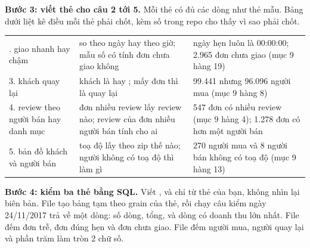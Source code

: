\textbf{Bước 3: viết thẻ cho câu 2 tới 5.} Mỗi thẻ có đủ các dòng như thẻ mẫu. Bảng dưới liệt kê điều mỗi thẻ phải chốt, kèm số trong repo cho thấy vì sao phải chốt.

\begin{xltabular}{\textwidth}{@{}P{2.8cm} L P{4.8cm}@{}}
\toprule
{} &  &  \\
\midrule
\endhead
\bottomrule
{}. giao nhanh hay chậm & so theo ngày hay theo giờ; mẫu số có tính đơn chưa giao không & ngày hẹn luôn là 00:00:00; 2.965 đơn chưa giao (mục 9 hàng 19) \\
3. khách quay lại & khách là  hay ; mấy đơn thì là quay lại & 99.441  nhưng 96.096 người mua (mục 9 hàng 8) \\
4. review theo người bán hay danh mục & đơn nhiều review lấy review nào; review của đơn nhiều người bán tính cho ai & 547 đơn có nhiều review (mục 9 hàng 4); 1.278 đơn có hơn một người bán \\
5. bản đồ khách và người bán & toạ độ lấy theo zip thế nào; người không có toạ độ thì làm gì & 270 người mua và 8 người bán không có toạ độ (mục 9 hàng 13) \\
\end{xltabular}

\textbf{Bước 4: kiểm ba thẻ bằng SQL.} Viết ,  và  chỉ từ thẻ của bạn, không nhìn lại biên bản. File  tạo bảng tạm theo grain của thẻ, rồi chạy câu kiểm ngày 24/11/2017 trả về một dòng: số dòng, tổng, và dòng có doanh thu lớn nhất. File  đếm đơn trễ, đơn đúng hẹn và đơn chưa giao. File  đếm người mua, người quay lại và phần trăm làm tròn 2 chữ số.

